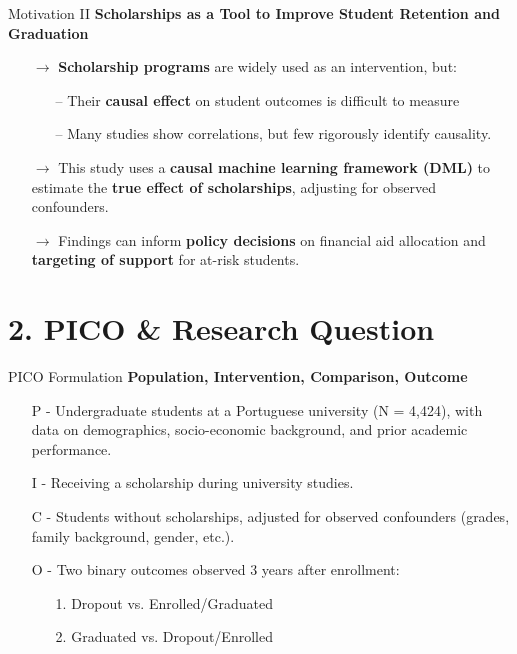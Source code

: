 \documentclass[aspectratio=169]{beamer}
\begin{document}
  \begin{frame}{Motivation II}
  	\textbf{Scholarships as a Tool to Improve Student Retention and Graduation}
  	
  	\begin{itemize}
  		\item [$\rightarrow$]  \textbf{Scholarship programs} are widely used as an intervention, but:
  		\begin{itemize}
  		  		\item [--] Their  \textbf{causal effect} on student outcomes is difficult to measure
  		  		\item [--] Many studies show correlations, but few rigorously identify causality.
   		\end{itemize}
   		\item [$\rightarrow$] This study uses a \textbf{causal machine learning framework (DML)} to estimate the  \textbf{true effect of scholarships}, adjusting for observed confounders.
   		\item [$\rightarrow$] Findings can inform \textbf{policy decisions} on financial aid allocation and \textbf{targeting of support} for at-risk students.
  	\end{itemize}
  \end{frame}
  
  \section{2. PICO \& Research Question}
  
  \begin{frame}{PICO Formulation}
  \textbf{Population, Intervention, Comparison, Outcome}
  	\begin{itemize}
  		\item [P - ] Undergraduate students at a Portuguese university (N = 4,424), with data on demographics, socio-economic background, and prior academic performance.
  		\item [I - ] Receiving a scholarship during university studies.
  		\item [C - ] Students without scholarships, adjusted for observed confounders (grades, family background, gender, etc.).
  		\item [O - ] Two binary outcomes observed 3 years after enrollment:
  
  	\begin{itemize}
  		\item [1.] Dropout vs. Enrolled/Graduated
  		\item [2.] Graduated vs. Dropout/Enrolled
  	\end{itemize}
  	
  	\end{itemize}
  \end{frame}
\end{document}

